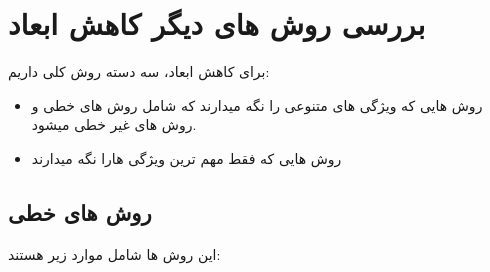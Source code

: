 \documentclass[12pt]{article}
\begin{document}
    \section{بررسی روش های دیگر کاهش ابعاد}
برای کاهش ابعاد، سه دسته روش کلی داریم:
\begin{itemize}
	
	\item 
	روش هایی که ویژگی های متنوعی را نگه میدارند که شامل روش های خطی و روش های غیر خطی میشود.
	
	\item 	  
	  روش هایی که فقط مهم ترین ویژگی هارا نگه میدارند
\end{itemize}

  \subsection{روش های خطی}
  این روش ها شامل موارد زیر هستند:
  
\end{document}
